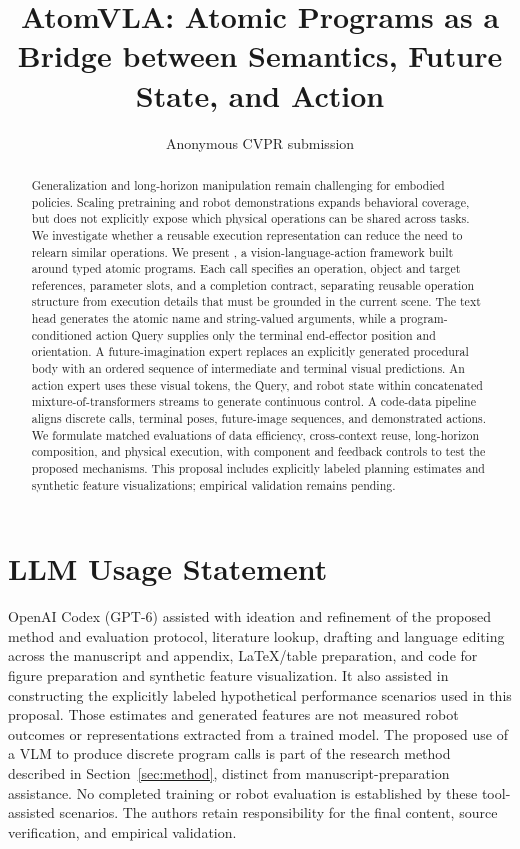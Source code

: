 \documentclass[10pt,twocolumn,letterpaper]{article}
\title{AtomVLA: Atomic Programs as a Bridge between Semantics, Future State, and Action}
\author{Anonymous CVPR submission}
\begin{document}
\maketitle
\nolinenumbers

\begin{abstract}
Generalization and long-horizon manipulation remain challenging for embodied policies. Scaling pretraining and robot demonstrations expands behavioral coverage, but does not explicitly expose which physical operations can be shared across tasks. We investigate whether a reusable execution representation can reduce the need to relearn similar operations. We present \model{}, a vision-language-action framework built around typed atomic programs. Each call specifies an operation, object and target references, parameter slots, and a completion contract, separating reusable operation structure from execution details that must be grounded in the current scene. The text head generates the atomic name and string-valued arguments, while a program-conditioned action Query supplies only the terminal end-effector position and orientation. A future-imagination expert replaces an explicitly generated procedural body with an ordered sequence of intermediate and terminal visual predictions. An action expert uses these visual tokens, the Query, and robot state within concatenated mixture-of-transformers streams to generate continuous control. A code-data pipeline aligns discrete calls, terminal poses, future-image sequences, and demonstrated actions. We formulate matched evaluations of data efficiency, cross-context reuse, long-horizon composition, and physical execution, with component and feedback controls to test the proposed mechanisms. This proposal includes explicitly labeled planning estimates and synthetic feature visualizations; empirical validation remains pending.
\end{abstract}







\clearpage
\section*{LLM Usage Statement}
OpenAI Codex (GPT-6) assisted with ideation and refinement of the proposed method and evaluation protocol, literature lookup, drafting and language editing across the manuscript and appendix, LaTeX/table preparation, and code for figure preparation and synthetic feature visualization. It also assisted in constructing the explicitly labeled hypothetical performance scenarios used in this proposal. Those estimates and generated features are not measured robot outcomes or representations extracted from a trained model. The proposed use of a VLM to produce discrete program calls is part of the research method described in Section~\ref{sec:method}, distinct from manuscript-preparation assistance. No completed training or robot evaluation is established by these tool-assisted scenarios. The authors retain responsibility for the final content, source verification, and empirical validation.

{\small


}
\clearpage

\end{document}
